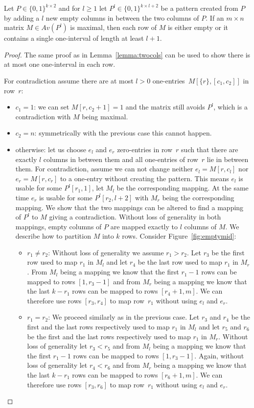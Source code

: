 \begin{lemma}
\label{lemma:maxmult}
Let $P\in\{0,1\}^{k\times2}$ and for $l\geq1$ let $P^l\in\{0,1\}^{k\times l+2}$ be a pattern created from $P$ by adding a $l$ new empty columns in between the two columns of $P$. If an $m\times n$ matrix $M\in Av(P^l)$ is maximal, then each row of $M$ is either empty or it contains a single one-interval of length at least $l+1$.
\end{lemma}
\begin{proof}
The same proof as in Lemma~\ref{lemma:twocols} can be used to show there is at most one one-interval in each row.

For contradiction assume there are at most $l>0$ one-entries~$M[\{r\},[c_1,c_2]]$ in row~$r$:
\begin{itemize}
	\item $c_1=1$: we can set $M[r,c_2+1]=1$ and the matrix still avoids $P^l$, which is a contradiction with $M$ being maximal.
	\item $c_2=n$: symmetrically with the previous case this cannot happen.
	\item otherwise: let us choose $e_l$ and $e_r$ zero-entries in row~$r$ such that there are exactly $l$ columns in between them and all one-entries of row~$r$ lie in between them. For contradiction, assume we can not change neither $e_l=M[r,c_l]$ nor $e_r=M[r,c_r]$ to a one-entry without creating the pattern. This means $e_l$ is usable for some $P^l[r_1,1]$, let $M_l$ be the corresponding mapping. At the same time $e_r$ is usable for some $P^l[r_2,l+2]$ with $M_r$ being the corresponding mapping. We show that the two mappings can be altered to find a mapping of $P^l$ to $M$ giving a contradiction. Without loss of generality in both mappings, empty columns of $P$ are mapped exactly to $l$ columns of $M$. We describe how to partition $M$ into $k$ rows. Consider Figure~\ref{fig:emptymid}:
	\begin{itemize}
		\item $r_1\neq r_2$: Without loss of generality we assume $r_1>r_2$. Let $r_3$ be the first row used to map $r_1$ in $M_l$ and let $r_4$ be the last row used to map $r_1$ in $M_r$. From $M_l$ being a mapping we know that the first $r_1-1$ rows can be mapped to rows $[1,r_3-1]$ and from $M_r$ being a mapping we know that the last $k-r_1$ rows can be mapped to rows $[r_4+1,m]$. We can therefore use rows $[r_3,r_4]$ to map row~$r_1$ without using $e_l$ and $e_r$.
		\item $r_1=r_2$: We proceed similarly as in the previous case. Let $r_3$ and $r_4$ be the first and the last rows respectively used to map $r_1$ in $M_l$ and let $r_5$ and $r_6$ be the first and the last rows respectively used to map $r_1$ in $M_r$. Without loss of generality let $r_3<r_5$ and from $M_l$ being a mapping we know that the first $r_1-1$ rows can be mapped to rows $[1,r_3-1]$. Again, without loss of generality let $r_4<r_6$ and from $M_r$ being a mapping we know that the last $k-r_1$ rows can be mapped to rows $[r_6+1,m]$. We can therefore use rows $[r_3,r_6]$ to map row~$r_1$ without using $e_l$ and $e_r$.

\end{itemize}
\end{itemize}
\end{proof}
